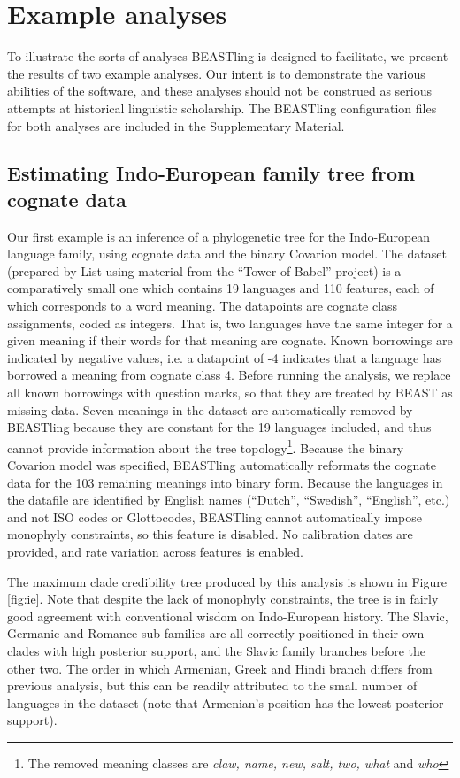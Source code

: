 \documentclass[twocolumn,10pt]{scrartcl}
\begin{document}
\section{Example analyses}

To illustrate the sorts of analyses BEASTling is designed to facilitate, we present the results of two example analyses.  Our intent is to demonstrate the various abilities of the software, and these analyses should not be construed as serious attempts at historical linguistic scholarship.  The BEASTling configuration files for both analyses are included in the Supplementary Material.

\subsection{Estimating Indo-European family tree from cognate data}

Our first example is an inference of a phylogenetic tree for the Indo-European language family, using cognate data and the binary Covarion model.  The dataset\cite{List2014a} (prepared by List\cite{List2014} using material from the ``Tower of Babel'' project\cite{Starostin2008}) is a comparatively small one which contains 19 languages and 110 features, each of which corresponds to a word meaning.  The datapoints are cognate class assignments, coded as integers.  That is, two languages have the same integer for a given meaning if their words for that meaning are cognate.  Known borrowings are indicated by negative values, i.e. a datapoint of -4 indicates that a language has borrowed a meaning from cognate class 4.  Before running the analysis, we replace all known borrowings with question marks, so that they are treated by BEAST as missing data.  Seven meanings in the dataset are automatically removed by BEASTling because they are constant for the 19 languages included, and thus cannot provide information about the tree topology\footnote{The removed meaning classes are \emph{claw, name, new, salt, two, what} and \emph{who}}.  Because the binary Covarion model was specified, BEASTling automatically reformats the cognate data for the 103 remaining meanings into binary form.  Because the languages in the datafile are identified by English names (``Dutch'', ``Swedish'', ``English'', etc.) and not ISO codes or Glottocodes, BEASTling cannot automatically impose monophyly constraints, so this feature is disabled.  No calibration dates are provided, and rate variation across features is enabled.

The maximum clade credibility tree produced by this analysis is shown in Figure \ref{fig:ie}.  Note that despite the lack of monophyly constraints, the tree is in fairly good agreement with conventional wisdom on Indo-European history.  The Slavic, Germanic and Romance sub-families are all correctly positioned in their own clades with high posterior support, and the Slavic family branches before the other two.  The order in which Armenian, Greek and Hindi branch differs from previous analysis\cite{Gray2003,Bouckaert2012}, but this can be readily attributed to the small number of languages in the dataset (note that Armenian's position has the lowest posterior support).
\end{document}
